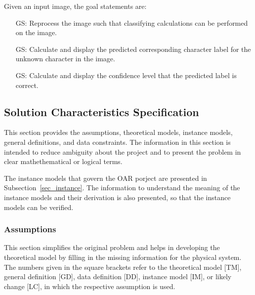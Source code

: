 \documentclass[12pt]{article}
\newcounter{goalnum} %
\begin{document}
\noindent Given an input image, the goal statements are:

\begin{itemize}

\item[GS\refstepcounter{goalnum}\thegoalnum \label{G_meaningfulLabel}:] Reprocess the image such that classifying
calculations can be performed on the image.

\item[GS\refstepcounter{goalnum}\thegoalnum \label{G_meaningfulLabel}:] Calculate and display the predicted 
corresponding character label for the unknown character in the image.

 \item[GS\refstepcounter{goalnum}\thegoalnum \label{G_meaningfulLabel}:] Calculate and display the confidence level that
 the predicted label is correct.

\end{itemize}

\subsection{Solution Characteristics Specification}

This section provides the assumptions, theoretical models, instance models, general definitions,
and data constraints. The information in this section is intended to reduce ambiguity about the project and 
to present the problem in clear mathethematical or logical terms.

The instance models that govern the OAR porject are presented in
Subsection~\ref{sec_instance}.  The information to understand the meaning of the
instance models and their derivation is also presented, so that the instance
models can be verified.

\subsubsection{Assumptions} \label{sec_assumpt}


This section simplifies the original problem and helps in developing the
theoretical model by filling in the missing information for the physical system.
The numbers given in the square brackets refer to the theoretical model [TM],
general definition [GD], data definition [DD], instance model [IM], or likely
change [LC], in which the respective assumption is used.
\end{document}
